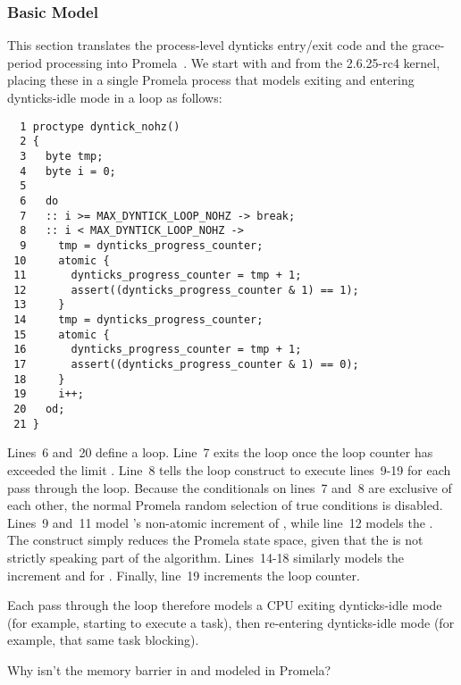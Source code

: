 \subsubsection{Basic Model}
\label{sec:formal:Basic Model}

This section translates the process-level dynticks entry/exit
code and the grace-period processing into
Promela~\cite{Holzmann03a}.
We start with  and
from the 2.6.25-rc4 kernel, placing these in a single Promela
process that models exiting and entering dynticks-idle mode in
a loop as follows:

{ \scriptsize
\begin{verbatim}
  1 proctype dyntick_nohz()
  2 {
  3   byte tmp;
  4   byte i = 0;
  5
  6   do
  7   :: i >= MAX_DYNTICK_LOOP_NOHZ -> break;
  8   :: i < MAX_DYNTICK_LOOP_NOHZ ->
  9     tmp = dynticks_progress_counter;
 10     atomic {
 11       dynticks_progress_counter = tmp + 1;
 12       assert((dynticks_progress_counter & 1) == 1);
 13     }
 14     tmp = dynticks_progress_counter;
 15     atomic {
 16       dynticks_progress_counter = tmp + 1;
 17       assert((dynticks_progress_counter & 1) == 0);
 18     }
 19     i++;
 20   od;
 21 }
\end{verbatim}
}

Lines~6 and~20 define a loop.
Line~7 exits the loop once the loop counter 
has exceeded the limit .
Line~8 tells the loop construct to execute lines~9-19
for each pass through the loop.
Because the conditionals on lines~7 and~8 are exclusive of
each other, the normal Promela random selection of true conditions
is disabled.
Lines~9 and~11 model 's non-atomic
increment of , while
line~12 models the .
The  construct simply reduces the Promela state space,
given that the  is not strictly speaking part
of the algorithm.
Lines~14-18 similarly models the increment and
 for .
Finally, line~19 increments the loop counter.

Each pass through the loop therefore models a CPU exiting
dynticks-idle mode (for example, starting to execute a task), then
re-entering dynticks-idle mode (for example, that same task blocking).

\QuickQuiz{}
	Why isn't the memory barrier in 
	and  modeled in Promela?
 \QuickQuizEnd

